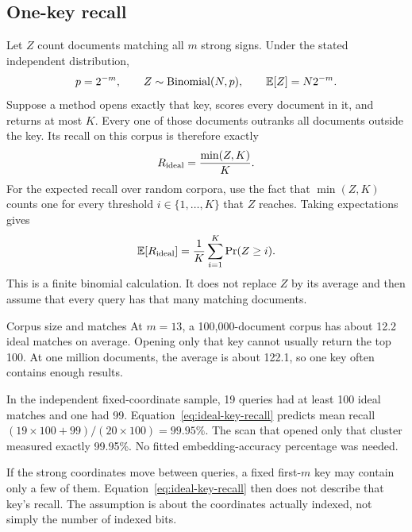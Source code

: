 \subsection{One-key recall}
Let $Z$ count documents matching all $m$ strong signs. Under the stated independent distribution,
\[
p=2^{-m},\qquad Z\sim\operatorname{Binomial}(N,p),\qquad \mathbb E[Z]=N2^{-m}.
\]
Suppose a method opens exactly that key, scores every document in it, and returns at most $K$.
Every one of those documents outranks all documents outside the key. Its recall on this corpus
is therefore exactly
\begin{equation}
R_{\rm ideal}=\frac{\min(Z,K)}{K}.
\label{eq:ideal-key-recall}
\end{equation}
For the expected recall over random corpora, use the fact that $\min(Z,K)$ counts one for every
threshold $i\in\{1,\ldots,K\}$ that $Z$ reaches. Taking expectations gives
\begin{equation}
\mathbb E[R_{\rm ideal}]=\frac{1}{K}\sum_{i=1}^{K}\Pr(Z\ge i).
\label{eq:expected-ideal-recall}
\end{equation}
This is a finite binomial calculation. It does not replace $Z$ by its average and then assume
that every query has that many matching documents.

\begin{examplebox}{Corpus size and matches}
At $m=13$, a 100,000-document corpus has about 12.2 ideal matches on average. Opening only
that key cannot usually return the top 100. At one million documents, the average is about
122.1, so one key often contains enough results.

In the independent fixed-coordinate sample, 19 queries had at least 100 ideal matches and
one had 99. Equation~\eqref{eq:ideal-key-recall} predicts mean recall
$(19\times100+99)/(20\times100)=99.95\%$. The scan that opened only that cluster measured exactly
99.95\%. No fitted embedding-accuracy percentage was needed.
\end{examplebox}
If the strong coordinates move between queries, a fixed first-$m$ key may contain only a few
of them. Equation~\eqref{eq:ideal-key-recall} then does not describe that key's recall. The
assumption is about the coordinates actually indexed, not simply the number of indexed bits.

